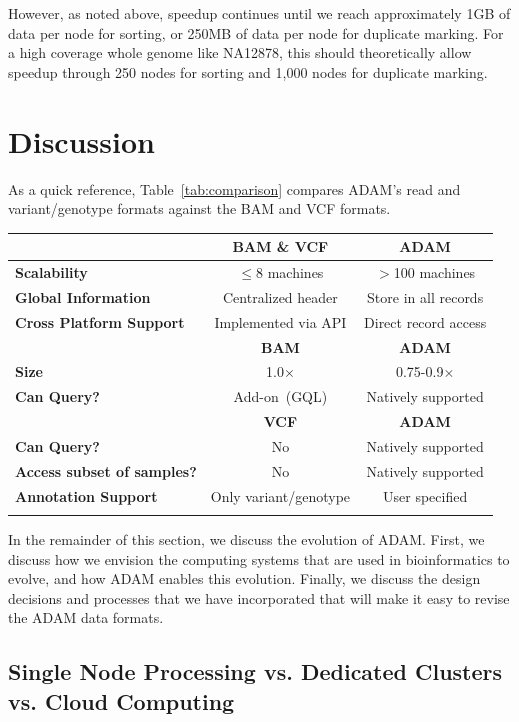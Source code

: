 \documentclass{bioinfo}
\begin{document}
However, as noted above, speedup continues until we reach approximately 1GB of data per node for sorting, or 250MB of data per node for duplicate marking. For a high
coverage whole genome like NA12878, this should theoretically allow speedup through 250 nodes for sorting and 1,000 nodes for duplicate marking.

\section{Discussion}
\label{sec:discussion}

As a quick reference, Table~\ref{tab:comparison} compares ADAM's read and variant/genotype formats against the BAM and VCF formats.

\begin{table}[h]
{\begin{tabular}{ l c c }
\toprule
 & \bf BAM \& VCF & \bf ADAM \\
\midrule
\bf Scalability & $\le$8 machines & $>$100 machines \\
\bf Global Information & Centralized header & Store in all records \\
\bf Cross Platform Support & Implemented via API & Direct record access \\
\midrule
 & \bf BAM & \bf ADAM \\
\midrule
\bf Size & 1.0$\times$ & 0.75-0.9$\times$ \\
\bf Can Query? & Add-on~(GQL) & Natively supported \\ 
\midrule
& \bf VCF & \bf ADAM \\
\midrule
\bf Can Query? & No & Natively supported \\ 
\bf Access subset of samples? & No & Natively supported \\
\bf Annotation Support & Only variant/genotype & User specified \\
\botrule
\end{tabular}}{}
\end{table}

In the remainder of this section, we discuss the evolution of ADAM. First, we discuss how we envision the computing systems that are used in bioinformatics to evolve, and
how ADAM enables this evolution. Finally, we discuss the design decisions and processes that we have incorporated that will make it easy to revise the ADAM data formats.

\subsection{Single Node Processing vs. Dedicated Clusters vs. Cloud Computing}
\label{sec:single-vs-clusters-vs-cloud}
\end{document}
